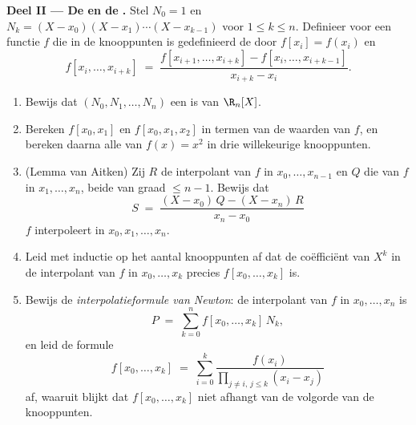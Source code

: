 \begin{problem}
\medskip
\noindent\textbf{Deel II --- De  en de .} Stel $N_0 = 1$ en $N_k = (X - x_0)(X - x_1) \cdots
(X - x_{k-1})$ voor $1 \leq k \leq n$. Definieer voor een functie
$f$ die in de knooppunten is gedefinieerd de \emph{} door $f[x_i] = f(x_i)$ en
\[
f[x_i, \dots, x_{i+k}] \;=\;
\frac{f[x_{i+1}, \dots, x_{i+k}] - f[x_i, \dots, x_{i+k-1}]}
{x_{i+k} - x_i} .
\]
\begin{enumerate}[resume]
  \item Bewijs dat $(N_0, N_1, \dots, N_n)$ een  is van
        $\R_n[X]$.
  \item Bereken $f[x_0, x_1]$ en $f[x_0, x_1, x_2]$ in termen van
        de waarden van $f$, en bereken daarna alle  van $f(x) = x^2$ in drie willekeurige
        knooppunten.
  \item (Lemma van Aitken) Zij $R$ de interpolant van $f$ in $x_0,
        \dots, x_{n-1}$ en $Q$ die van $f$ in $x_1, \dots, x_n$,
        beide van graad $\leq n - 1$. Bewijs dat
        \[
        S \;=\; \frac{(X - x_0)\,Q - (X - x_n)\,R}{x_n - x_0}
        \]
        $f$ interpoleert in $x_0, x_1, \dots, x_n$.
  \item Leid met inductie op het aantal knooppunten af dat de
        coëfficiënt van $X^{k}$ in de interpolant van $f$ in $x_0,
        \dots, x_k$ precies $f[x_0, \dots, x_k]$ is.
  \item Bewijs de \emph{interpolatieformule van Newton}: de
        interpolant van $f$ in $x_0, \dots, x_n$ is
        \[
        P \;=\; \sum_{k=0}^{n} f[x_0, \dots, x_k]\, N_k ,
        \]
        en leid de  formule
        \[
        f[x_0, \dots, x_k] \;=\; \sum_{i=0}^{k}
        \frac{f(x_i)}{\prod_{j \neq i,\, j \leq k} (x_i - x_j)}
        \]
        af, waaruit blijkt dat $f[x_0, \dots, x_k]$ niet afhangt
        van de volgorde van de knooppunten.
\end{enumerate}


\end{problem}
